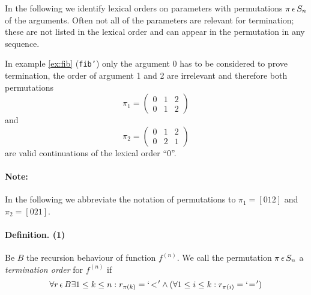 In the following we identify lexical orders on parameters with
permutations $\pi \,\epsilon\, S_n$ of the arguments. Often not all of the
parameters are relevant for termination; these are not listed in the
lexical order and can appear in the permutation in any sequence.

In example \ref{ex:fib} ({\tt fib'}) only the argument 0 has to be
considered to prove termination, the order of argument 1 and 2 are
irrelevant and therefore both permutations
$$
    \pi_1 = \left(\begin{array}{ccc}0&1&2\\ 0&1&2\end{array}\right)
$$
and
$$
    \pi_2 = \left(\begin{array}{ccc}0&1&2\\ 0&2&1\end{array}\right)
$$
are valid continuations of the lexical order ``0''.
\paragraph*{Note:}
In the following we abbreviate the notation of permutations to
$\pi_1 = [0 1 2]$ and $\pi_2 = [0 2 1]$.

\paragraph*{Definition. (1)}
Be $B$ the recursion behaviour of function $f^{(n)}$.
We call the permutation $\pi \,\epsilon\, S_n$ a {\em termination order} for
$f^{(n)}$ if
$$
    \forall r \,\epsilon\, B \exists 1 \leq k \leq n
    : r_{\pi(k)} = `\!<\!' \land (\forall 1 \leq i \leq k :
    r_{\pi(i)} = `\!=\!')
$$

